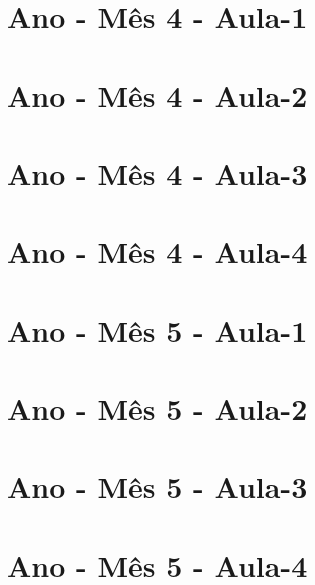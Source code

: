 \begin{multicols}{2}
\section[\sffamily 1\textordmasculine\space Ano - Mês 4 - Aula-1]{\textordmasculine\space Ano - Mês 4 - Aula-1}


\section[\sffamily 1\textordmasculine\space Ano - Mês 4 - Aula-2]{\textordmasculine\space Ano - Mês 4 - Aula-2}


\section[\sffamily 1\textordmasculine\space Ano - Mês 4 - Aula-3]{\textordmasculine\space Ano - Mês 4 - Aula-3}


\section[\sffamily 1\textordmasculine\space Ano - Mês 4 - Aula-4]{\textordmasculine\space Ano - Mês 4 - Aula-4}


\section[\sffamily 1\textordmasculine\space Ano - Mês 5 - Aula-1]{\textordmasculine\space Ano - Mês 5 - Aula-1}


\section[\sffamily 1\textordmasculine\space Ano - Mês 5 - Aula-2]{\textordmasculine\space Ano - Mês 5 - Aula-2}


\section[\sffamily 1\textordmasculine\space Ano - Mês 5 - Aula-3]{\textordmasculine\space Ano - Mês 5 - Aula-3}


\section[\sffamily 1\textordmasculine\space Ano - Mês 5 - Aula-4]{\textordmasculine\space Ano - Mês 5 - Aula-4}



\end{multicols}
